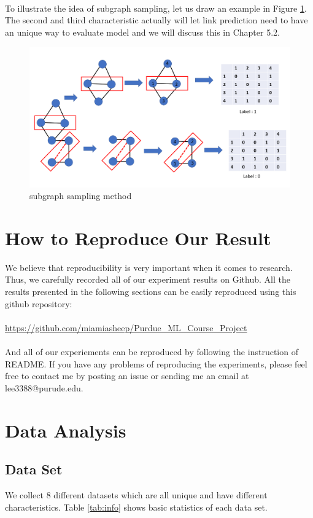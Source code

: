\documentclass[12pt]{article}
\begin{document}
\\ 
To illustrate the idea of subgraph sampling, let us draw an example in Figure \ref{fig:subsample}. 
\\
The second and third characteristic actually will let link prediction need to have an unique way to evaluate model and we will discuss this in Chapter 5.2. 
\\
\begin{figure}[h]
	\centering
	\includegraphics[scale=0.5]{subgraph_sampling_approach}
	\caption{subgraph sampling method}
	\label{fig:subsample}
\end{figure}

\section{How to Reproduce Our Result}
We believe that reproducibility is very important when it comes to research. Thus, we carefully recorded all of our experiment results on Github. All the results presented in the following sections can be easily reproduced using this github repository: 
\\
\\
\url{https://github.com/miamiasheep/Purdue\_ML\_Course\_Project}
\\
\\
And all of our experiements can be reproduced by following the instruction of README. If you have any problems of reproducing the experiments, please feel free to contact me by posting an issue or sending me an email at lee3388@purude.edu.

\section{Data Analysis}

\subsection {Data Set}
We collect 8 different datasets which are all unique and have different characteristics. Table \ref{tab:info} shows basic statistics of each data set.
\end{document}
